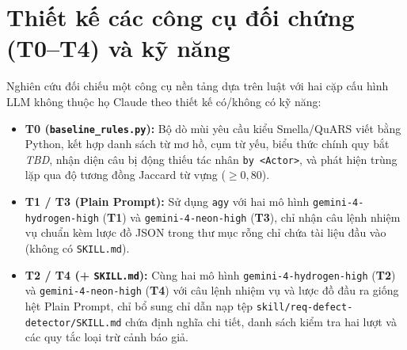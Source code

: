 \documentclass[12pt,a4paper]{report}
\begin{document}
\section{Thiết kế các công cụ đối chứng (T0--T4) và kỹ năng}
Nghiên cứu đối chiếu một công cụ nền tảng dựa trên luật với hai cặp cấu hình LLM không thuộc họ Claude theo thiết kế có/không có kỹ năng:
\begin{itemize}
  \item \textbf{T0 (\texttt{baseline\_rules.py}):} Bộ dò mùi yêu cầu kiểu Smella/QuARS viết bằng Python, kết hợp danh sách từ mơ hồ, cụm từ yếu, biểu thức chính quy bắt \textit{TBD}, nhận diện câu bị động thiếu tác nhân \texttt{by <Actor>}, và phát hiện trùng lặp qua độ tương đồng Jaccard từ vựng ($\ge 0{,}80$).
  \item \textbf{T1 / T3 (Plain Prompt):} Sử dụng \texttt{agy} với hai mô hình \texttt{gemini-4-hydrogen-high} (\textbf{T1}) và \texttt{gemini-4-neon-high} (\textbf{T3}), chỉ nhận câu lệnh nhiệm vụ chuẩn kèm lược đồ JSON trong thư mục rỗng chỉ chứa tài liệu đầu vào (không có \texttt{SKILL.md}).
  \item \textbf{T2 / T4 (+ \texttt{SKILL.md}):} Cùng hai mô hình \texttt{gemini-4-hydrogen-high} (\textbf{T2}) và \texttt{gemini-4-neon-high} (\textbf{T4}) với câu lệnh nhiệm vụ và lược đồ đầu ra giống hệt Plain Prompt, chỉ bổ sung chỉ dẫn nạp tệp \texttt{skill/req-defect-detector/SKILL.md} chứa định nghĩa chi tiết, danh sách kiểm tra hai lượt và các quy tắc loại trừ cảnh báo giả.
\end{itemize}
\end{document}
